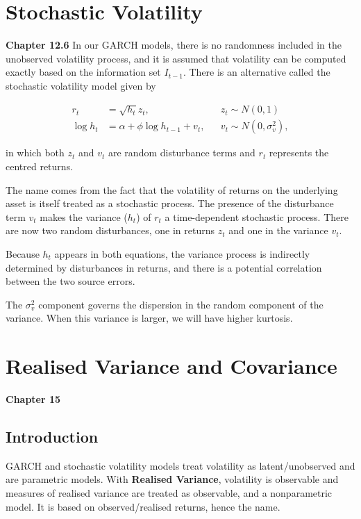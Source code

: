 \documentclass[11pt]{article}
\begin{document}
\newpage


\section{Stochastic Volatility}
\textbf{Chapter 12.6}
In our GARCH models, there is no randomness included in the unobserved volatility process, and it is assumed that volatility can be computed exactly based on the information set $I_{t-1}$. There is an alternative called the stochastic volatility model given by

\begin{equation}
\label{stochastic volatility}
\begin{aligned}
r_t & =\sqrt{h_t} z_t, & & z_t \sim N(0,1) \\
\log h_t & =\alpha+\phi \log h_{t-1}+v_t, & & v_t \sim N\left(0, \sigma_v^2\right),
\end{aligned}
\end{equation}

in which both $z_t$ and $v_t$ are random disturbance terms and $r_t$ represents the centred returns.

The name comes from the fact that the volatility of returns on the underlying asset is itself treated as a stochastic process. The presence of the disturbance term $v_t$ makes the variance ($h_t$) of $r_t$ a time-dependent stochastic process. There are now two random disturbances, one in returns $z_t$ and one in the variance $v_t$.

Because $h_t$ appears in both equations, the variance process is indirectly determined by disturbances in returns, and there is a potential correlation between the two source errors.

The $\sigma_v^2$ component governs the dispersion in the random component of the variance. When this variance is larger, we will have higher kurtosis. 

\section{Realised Variance and Covariance}
\textbf{Chapter 15}

\subsection{Introduction}

GARCH and stochastic volatility models treat volatility as latent/unobserved and are parametric models. With \textbf{Realised Variance}, volatility is observable and measures of realised variance are treated as observable, and a nonparametric model. It is based on observed/realised returns, hence the name.
\end{document}
